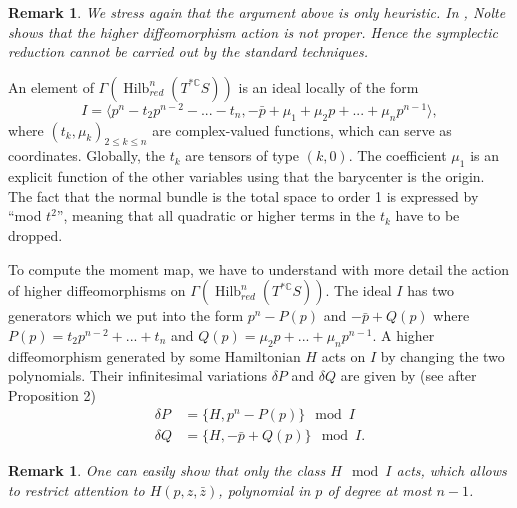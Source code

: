 \documentclass[11pt]{amsart}
\newtheorem{Remark}[thm]{Remark}
\numberwithin{thm}{section} %
\numberwithin{equation}{section} %
\numberwithin{figure}{section} %
\newcommand*{\C}{\mathbb{C}}
\renewcommand*{\S}{S}
\DeclareMathOperator{\Hilb}{Hilb}
\begin{document}
\begin{Remark}
We stress again that the argument above is only heuristic. In \cite{Nolte}, Nolte shows that the higher diffeomorphism action is not proper. Hence the symplectic reduction cannot be carried out by the standard techniques.
\end{Remark}

An element of $\Gamma(\Hilb^n_{red}(T^{*\C}\S))$ is an ideal locally of the form 
\begin{equation}\label{ideal-I}
I=\langle p^n-t_2p^{n-2}-...-t_n, -\bar{p}+\mu_1+\mu_2p+...+\mu_np^{n-1}\rangle,
\end{equation}
where $(t_k, \mu_k)_{2\leq k \leq n}$ are complex-valued functions, which can serve as coordinates. Globally, the $t_k$ are tensors of type $(k,0)$.
The coefficient $\mu_1$ is an explicit function of the other variables using that the barycenter is the origin. The fact that the normal bundle is the total space to order 1 is expressed by ``mod $t^2$'', meaning that all quadratic or higher terms in the $t_k$ have to be dropped.

To compute the moment map, we have to understand with more detail the action of higher diffeomorphisms on $\Gamma(\Hilb^n_{red}(T^{*\mathbb{C}}S))$. The ideal $I$ has two generators which we put into the form $p^n-P(p)$ and $-\bar{p}+Q(p)$ where $P(p)=t_2p^{n-2}+...+t_n$ and $Q(p)=\mu_2p+...+\mu_np^{n-1}$. A higher diffeomorphism generated by some Hamiltonian $H$ acts on $I$ by changing the two polynomials. Their infinitesimal variations $\delta P$ and $\delta Q$ are given by (see \cite{FockThomas} after Proposition 2)
\begin{align}
\delta P &= \{H, p^n-P(p)\} \mod I \nonumber \\
\delta Q &= \{H, -\bar{p}+Q(p)\} \mod I. \label{idealvariation}
\end{align}

\begin{Remark}
One can easily show that only the class $H \mod I$ acts, which allows to restrict attention to $H(p,z,\bar{z})$, polynomial in $p$ of degree at most $n-1$.
\end{Remark}
\end{document}
